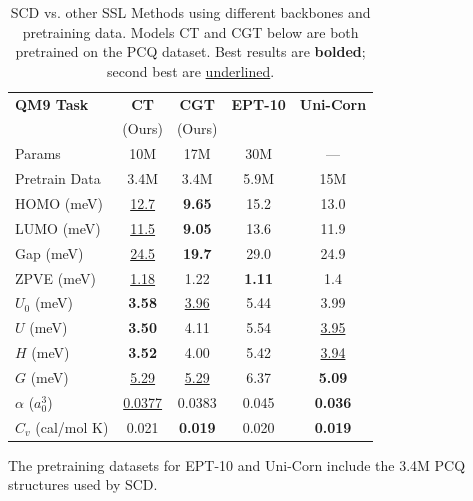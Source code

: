 
\begin{table}[h]
\centering
\caption{SCD vs. other SSL Methods using different backbones and pretraining data. Models CT and CGT below are both pretrained on the PCQ dataset. Best results are \textbf{bolded}; second best are \underline{underlined}.}
\label{tab:scd_vs_SSL_qm9}
\small
\setlength{\tabcolsep}{3pt}
\begin{tabular}{l c c c c}
\toprule
\textbf{QM9 Task} & \textbf{CT} & \textbf{CGT} & \textbf{EPT-10} & \textbf{Uni-Corn} \\
 & (Ours) & (Ours) & \cite{EPT_jiao2025} & \cite{UniCorn_Feng2024} \\
\midrule
Params & 10M & 17M & 30M & --- \\
Pretrain Data & 3.4M & 3.4M & 5.9M & 15M \\
\midrule
HOMO (meV) & \underline{12.7} & \textbf{9.65} & 15.2 & 13.0 \\
LUMO (meV) & \underline{11.5} & \textbf{9.05} & 13.6 & 11.9 \\
Gap (meV) & \underline{24.5} & \textbf{19.7} & 29.0 & 24.9 \\
ZPVE (meV) & \underline{1.18} & 1.22 & \textbf{1.11} & 1.4 \\
$U_0$ (meV) & \textbf{3.58} & \underline{3.96} & 5.44 & 3.99 \\
$U$ (meV) & \textbf{3.50} & 4.11 & 5.54 & \underline{3.95} \\
$H$ (meV) & \textbf{3.52} & 4.00 & 5.42 & \underline{3.94} \\
$G$ (meV) & \underline{5.29} & \underline{5.29} & 6.37 & \textbf{5.09} \\
$\alpha$ ($a_0^3$) & \underline{0.0377} & 0.0383 & 0.045 & \textbf{0.036} \\
$C_v$ (cal/mol K) & 0.021 & \textbf{0.019} & 0.020 & \textbf{0.019} \\
\bottomrule
\end{tabular}
\vspace{0.25em}
\flushleft\footnotesize The pretraining datasets for EPT-10 and Uni-Corn include the 3.4M PCQ structures used by SCD.
\end{table}
